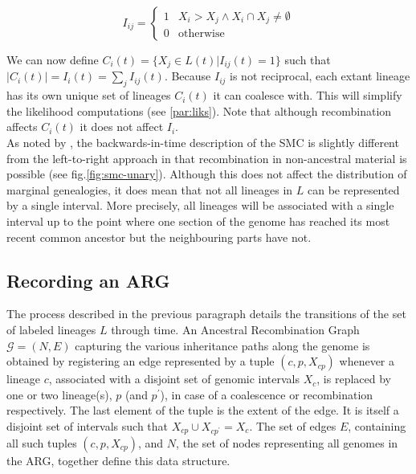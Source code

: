 \documentclass{article}
\begin{document}
\begin{equation} \label{def:coal}
I_{ij} = \begin{cases}
1 & X_i > X_j \wedge X_i \cap X_j \neq \emptyset \\
0 & \text{otherwise}
\end{cases}
\end{equation}

We can now define $C_i(t) = \{X_j \in L(t) | I_{ij}(t) = 1\}$ such that $|C_i(t)| = 
I_{i}(t) = \sum_{j} I_{ij}(t)$.
Because $I_{ij}$ is not reciprocal, each extant lineage has its own unique set of 
lineages $C_i(t)$ it can coalesce with. This will simplify the likelihood computations 
(see \ref{par:liks}). Note that although recombination affects $C_i(t)$ it does not 
affect $I_{i}$.\\ 

As noted by \cite{mcvean_approximating_2005}, the backwards-in-time description of the 
SMC is slightly different from the left-to-right approach in that recombination 
in non-ancestral material is possible (see fig.\ref{fig:smc-unary}). 
Although this does not affect the distribution 
of marginal genealogies, it does mean that not all lineages in $L$ can be represented 
by a single interval. More precisely, all lineages will be associated with 
a single interval up to the point where one section of the 
genome has reached its most recent common ancestor but the neighbouring parts have not.

\subsection{Recording an ARG} \label{par:recording}

The process described in the previous paragraph details the transitions of the 
set of labeled lineages $L$ through time. An Ancestral Recombination Graph 
$\mathcal{G} = (N, E)$ capturing the various inheritance paths along the genome 
is obtained by registering an edge represented by a tuple $(c, p, X_{cp})$ 
whenever a lineage $c$, associated with a disjoint set of genomic intervals $X_c$, is 
replaced by one or two lineage(s), $p$ (and $p^{\prime}$), 
in case of a coalescence or recombination respectively.
The last element of the tuple is the extent of the edge. It is itself a  
disjoint set of intervals such that $X_{cp} \cup X_{cp^{\prime}} = X_c$. 
The set of edges $E$, containing all such tuples $(c, p, X_{cp})$, 
and $N$, the set of nodes representing all genomes in the ARG, together
define this data structure.\\
\end{document}
